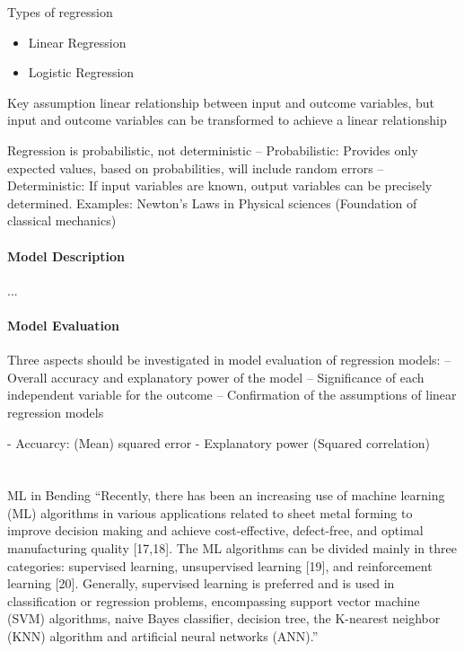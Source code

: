 Types of regression
\begin{itemize}
    \item Linear Regression
    \item Logistic Regression
\end{itemize}

Key assumption linear relationship between input and outcome variables, but input and outcome variables can be transformed to achieve a linear relationship 

Regression is probabilistic, not deterministic 
– Probabilistic: Provides only expected values, based on probabilities, will include random errors 
– Deterministic: If input variables are known, output variables can be precisely determined. Examples: Newton’s Laws in Physical sciences (Foundation of classical mechanics)

\paragraph{Model Description}
...

\paragraph{Model Evaluation} 
Three aspects should be investigated in model evaluation of regression models: 
– Overall accuracy and explanatory power of the model 
– Significance of each independent variable for the outcome 
– Confirmation of the assumptions of linear regression models

- Accuarcy: (Mean) squared error 
- Explanatory power (Squared correlation)


\section{}{ML in Bending}
“Recently, there has been an increasing use of machine learning (ML) algorithms in various applications related to sheet metal forming to improve decision making and achieve cost-effective, defect-free, and optimal manufacturing quality [17,18]. The ML algorithms can be divided mainly in three categories: supervised learning, unsupervised learning [19], and reinforcement learning [20]. Generally, supervised learning is preferred and is used in classification or regression problems, encompassing support vector machine (SVM) algorithms, naive Bayes classifier, decision tree, the K-nearest neighbor (KNN) algorithm and artificial neural networks (ANN).” 
\cite{cruz_applicationmachinelearning_2021}

